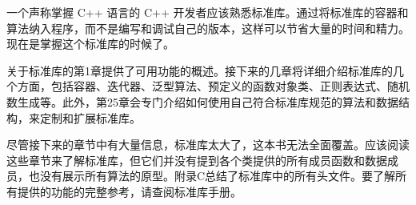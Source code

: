 一个声称掌握 C++ 语言的 C++ 开发者应该熟悉标准库。通过将标准库的容器和算法纳入程序，而不是编写和调试自己的版本，这样可以节省大量的时间和精力。现在是掌握这个标准库的时候了。

关于标准库的第1章提供了可用功能的概述。接下来的几章将详细介绍标准库的几个方面，包括容器、迭代器、泛型算法、预定义的函数对象类、正则表达式、随机数生成等。此外，第25章会专门介绍如何使用自己符合标准库规范的算法和数据结构，来定制和扩展标准库。

尽管接下来的章节中有大量信息，标准库太大了，这本书无法全面覆盖。应该阅读这些章节来了解标准库，但它们并没有提到各个类提供的所有成员函数和数据成员，也没有展示所有算法的原型。附录C总结了标准库中的所有头文件。要了解所有提供的功能的完整参考，请查阅标准库手册。





















